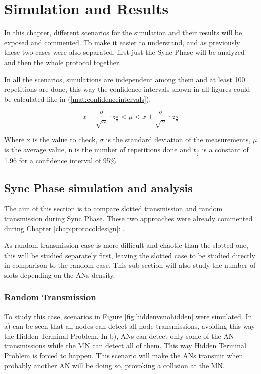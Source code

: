 \chapter{Simulation and Results}
\label{chap:simulationandresults}

In this chapter, different scenarios for the simulation and their results will be exposed and commented. To make it easier to understand, and as 
previously these two cases were also separated, first just the Sync Phase will be analyzed and then the whole protocol together.

In all the scenarios, simulations are independent among them and at least 100 repetitions are done, this way the confidence intervals
shown in all figures could be calculated like in (\ref{mat:confidenceintervals}).

\begin{equation}
  x-\frac{\sigma}{\sqrt{n}}\cdot z_{\frac{\alpha}{2}} < \mu < x+\frac{\sigma}{\sqrt{n}}\cdot z_{\frac{\alpha}{2}}
  \label{mat:confidenceintervals}
\end{equation}

Where x is the value to check, $\sigma$ is the standard deviation of the measurements, $\mu$ is the average value, n is the number of repetitions done and 
$t_{\frac{\alpha}{2}}$ is a constant of 1.96 for a confidence interval of 95\%.

\section{Sync Phase simulation and analysis}

The aim of this section is to compare slotted transmission and random transmission during Sync Phase. These two approaches were already commented 
during Chapter \ref{chap:protocoldesign}: .

As random transmission case is more difficult and chaotic than the slotted one, this will be studied separately first, leaving the slotted case 
to be studied directly in comparison to the random case. This sub-section will also study the number of slots depending on the \acp{AN} 
density.

\subsection{Random Transmission}

To study this case, scenarios in Figure \ref{fig:hiddenvsnohidden} were simulated. In a) can be seen that all nodes can detect all node 
transmissions, avoiding this way the Hidden Terminal Problem. In b), \acp{AN} can detect only some of the \ac{AN} transmissions while the 
\ac{MN} can detect all of them. This way Hidden Terminal Problem is forced to happen. This scenario will make the \acp{AN} transmit when 
probably another \ac{AN} will be doing so, provoking a collision at the \ac{MN}.

